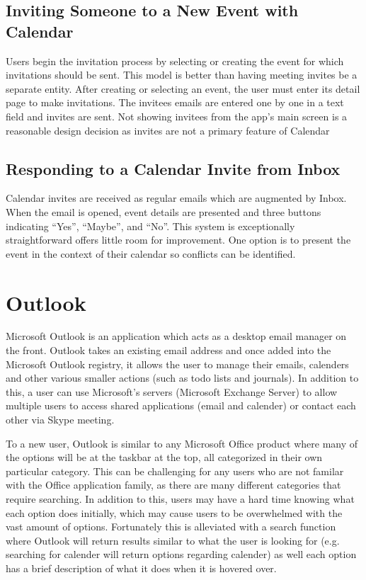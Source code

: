 \documentclass{sigchi}
\begin{document}
\begin{enumerate}
\subsection{Inviting Someone to a New Event with Calendar}
Users begin the invitation process by selecting or creating the event for which invitations should be sent.
This model is better than having meeting invites be a separate entity.
After creating or selecting an event, the user must enter its detail page to make invitations.
The invitees emails are entered one by one in a text field and invites are sent.
Not showing invitees from the app's main screen is a reasonable design decision as invites are not a primary feature of Calendar

\subsection{Responding to a Calendar Invite from Inbox}
Calendar invites are received as regular emails which are augmented by Inbox.
When the email is opened, event details are presented and three buttons indicating ``Yes'', ``Maybe'', and ``No''.
This system is exceptionally straightforward offers little room for improvement.
One option is to present the event in the context of their calendar so conflicts can be identified.

\section{Outlook}

Microsoft Outlook is an application which acts as a desktop email manager on the front. 
Outlook takes an existing email address and once added into the Microsoft Outlook registry, it allows the user to manage their emails, calenders and other various smaller actions (such as todo lists and journals). 
In addition to this, a user can use Microsoft's servers (Microsoft Exchange Server) to allow multiple users to access shared applications (email and calender) or contact each other via Skype meeting.

To a new user, Outlook is similar to any Microsoft Office product where many of the options will be at the taskbar at the top, all categorized in their own particular category. 
This can be challenging for any users who are not familar with the Office application family, as there are many different categories that require searching. 
In addition to this, users may have a hard time knowing what each option does initially, which may cause users to be overwhelmed with the vast amount of options. 
Fortunately this is alleviated with a search function where Outlook will return results similar to what the user is looking for (e.g. searching for calender will return options regarding calender) as well each option has a brief description of what it does when it is hovered over.


\end{enumerate}
\end{document}

